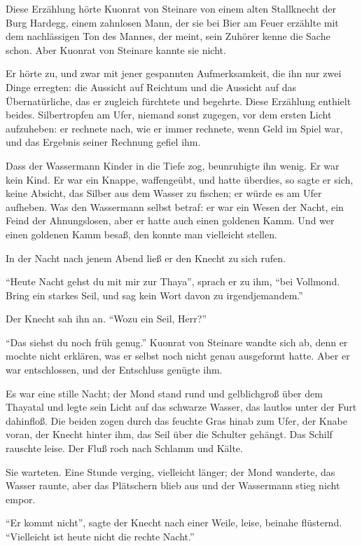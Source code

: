 Diese Erzählung hörte \gls{Kuonrat von Steinare} von einem alten Stallknecht der Burg \gls{Hardegg}, einem zahnlosen Mann, der sie bei Bier am Feuer erzählte mit dem nachlässigen Ton des Mannes, der meint, sein Zuhörer kenne die Sache schon. Aber \gls{Kuonrat von Steinare} kannte sie nicht.

Er hörte zu, und zwar mit jener gespannten Aufmerksamkeit, die ihn nur zwei Dinge erregten: die Aussicht auf Reichtum und die Aussicht auf das Übernatürliche, das er zugleich fürchtete und begehrte. Diese Erzählung enthielt beides. Silbertropfen am Ufer, niemand sonst zugegen, vor dem ersten Licht aufzuheben: er rechnete nach, wie er immer rechnete, wenn Geld im Spiel war, und das Ergebnis seiner Rechnung gefiel ihm.

Dass der Wassermann Kinder in die Tiefe zog, beunruhigte ihn wenig. Er war kein Kind. Er war ein Knappe, waffengeübt, und hatte überdies, so sagte er sich, keine Absicht, das Silber aus dem Wasser zu fischen; er würde es am Ufer aufheben. Was den Wassermann selbst betraf: er war ein Wesen der Nacht, ein Feind der Ahnungslosen, aber er hatte auch einen goldenen Kamm. Und wer einen goldenen Kamm besaß, den konnte man vielleicht stellen.

In der Nacht nach jenem Abend ließ er den \gls{Knecht} zu sich rufen.

\enquote{Heute Nacht gehst du mit mir zur Thaya}, sprach er zu ihm, \enquote{bei Vollmond. Bring ein starkes Seil, und sag kein Wort davon zu irgendjemandem.}

Der Knecht sah ihn an. \enquote{Wozu ein Seil, Herr?}

\enquote{Das siehst du noch früh genug.} \gls{Kuonrat von Steinare} wandte sich ab, denn er mochte nicht erklären, was er selbst noch nicht genau ausgeformt hatte. Aber er war entschlossen, und der Entschluss genügte ihm.

Es war eine stille Nacht; der Mond stand rund und gelblichgroß über dem Thayatal und legte sein Licht auf das schwarze Wasser, das lautlos unter der Furt dahinfloß. Die beiden zogen durch das feuchte Gras hinab zum Ufer, der Knabe voran, der Knecht hinter ihm, das Seil über die Schulter gehängt. Das Schilf rauschte leise. Der Fluß roch nach Schlamm und Kälte.

Sie warteten. Eine Stunde verging, vielleicht länger; der Mond wanderte, das Wasser raunte, aber das Plätschern blieb aus und der Wassermann stieg nicht empor.

\enquote{Er kommt nicht}, sagte der \gls{Knecht} nach einer Weile, leise, beinahe flüsternd. \enquote{Vielleicht ist heute nicht die rechte Nacht.}

